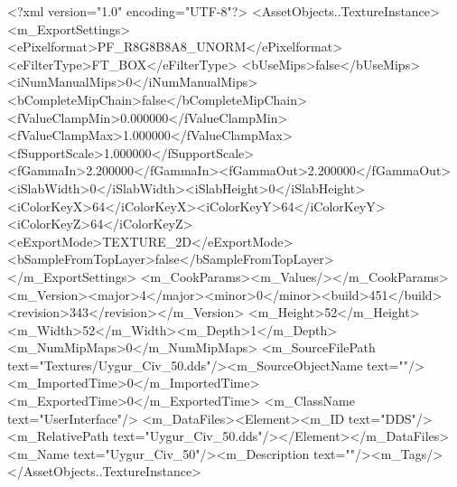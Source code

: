 <?xml version="1.0" encoding="UTF-8"?>
<AssetObjects..TextureInstance>
  <m_ExportSettings>
    <ePixelformat>PF_R8G8B8A8_UNORM</ePixelformat><eFilterType>FT_BOX</eFilterType>
    <bUseMips>false</bUseMips><iNumManualMips>0</iNumManualMips><bCompleteMipChain>false</bCompleteMipChain>
    <fValueClampMin>0.000000</fValueClampMin><fValueClampMax>1.000000</fValueClampMax><fSupportScale>1.000000</fSupportScale>
    <fGammaIn>2.200000</fGammaIn><fGammaOut>2.200000</fGammaOut><iSlabWidth>0</iSlabWidth><iSlabHeight>0</iSlabHeight>
    <iColorKeyX>64</iColorKeyX><iColorKeyY>64</iColorKeyY><iColorKeyZ>64</iColorKeyZ>
    <eExportMode>TEXTURE_2D</eExportMode><bSampleFromTopLayer>false</bSampleFromTopLayer>
  </m_ExportSettings>
  <m_CookParams><m_Values/></m_CookParams>
  <m_Version><major>4</major><minor>0</minor><build>451</build><revision>343</revision></m_Version>
  <m_Height>52</m_Height><m_Width>52</m_Width><m_Depth>1</m_Depth><m_NumMipMaps>0</m_NumMipMaps>
  <m_SourceFilePath text="Textures/Uygur_Civ_50.dds"/><m_SourceObjectName text=""/>
  <m_ImportedTime>0</m_ImportedTime><m_ExportedTime>0</m_ExportedTime>
  <m_ClassName text="UserInterface"/>
  <m_DataFiles><Element><m_ID text="DDS"/><m_RelativePath text="Uygur_Civ_50.dds"/></Element></m_DataFiles>
  <m_Name text="Uygur_Civ_50"/><m_Description text=""/><m_Tags/>
</AssetObjects..TextureInstance>
